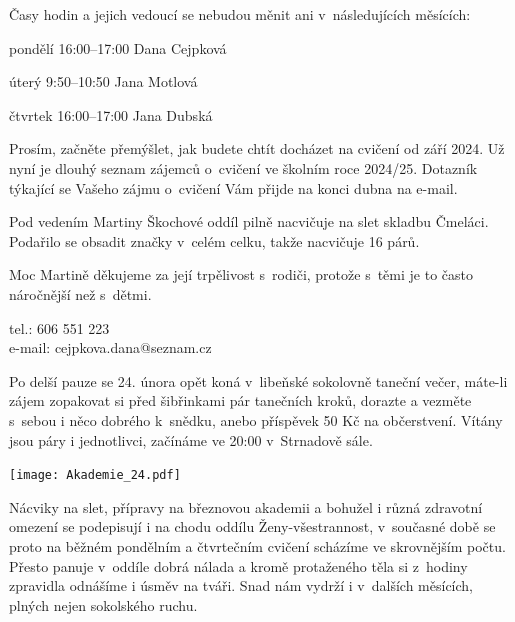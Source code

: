 \documentclass[11pt]{article}
\begin{document}
Časy hodin a jejich vedoucí se nebudou měnit ani v~následujících měsících:

\vspace*{6pt}
pondělí 16:00–17:00 Dana Cejpková

úterý 9:50–10:50 Jana Motlová

čtvrtek 16:00–17:00 Jana Dubská
\vspace*{6pt}

Prosím, začněte přemýšlet, jak budete chtít docházet na cvičení od září 2024. Už nyní je dlouhý seznam zájemců o~cvičení ve školním roce 2024/25. Dotazník týkající se Vašeho zájmu o~cvičení Vám přijde na konci dubna na e-mail.

Pod vedením Martiny Škochové oddíl pilně nacvičuje na slet skladbu Čmeláci. Podařilo se obsadit značky v~celém celku, takže nacvičuje 16 párů. 

Moc Martině děkujeme za její trpělivost s~rodiči, protože s~těmi je to často náročnější než s~dětmi.

\signature{Dana Cejpková}{tel.: 606 551 223\\e-mail: cejpkova.dana@seznam.cz}

\vspace*{24pt}

Po delší pauze se 24. února opět koná v~libeňské sokolovně taneční večer, máte-li zájem zopakovat si před šibřinkami pár tanečních kroků, dorazte a vezměte s~sebou i něco dobrého k~snědku, anebo příspěvek 50 Kč na občerstvení. Vítány jsou páry i jednotlivci, začínáme ve 20:00 v~Strnadově sále.

\vspace*{24pt}

\clearpage

\pagestyle{blank}
\begin{center}
  \noindent\texttt{[image: Akademie\_24.pdf]}
\end{center}
\restoregeometry

\clearpage
\pagestyle{standard}

Nácviky na slet, přípravy na březnovou akademii a bohužel i různá zdravotní omezení se podepisují i na chodu oddílu Ženy-všestrannost, v~současné době se proto na běžném pondělním a čtvrtečním cvičení scházíme ve skrovnějším počtu. Přesto panuje v~oddíle dobrá nálada a kromě protaženého těla si z~hodiny zpravidla odnášíme i úsměv na tváři. Snad nám vydrží i v~dalších měsících, plných nejen sokolského ruchu.   
\end{document}
